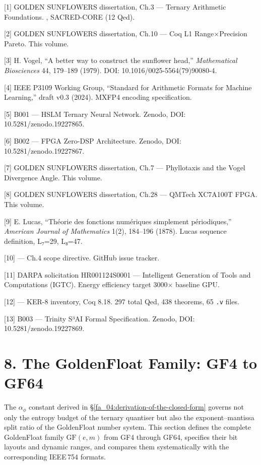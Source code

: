 [1] GOLDEN SUNFLOWERS dissertation, Ch.3 ---
Ternary Arithmetic Foundations.
,
SACRED-CORE (12 Qed).

[2] GOLDEN SUNFLOWERS dissertation, Ch.10 ---
Coq L1 Range$\times$Precision Pareto. This volume.

[3] H. Vogel, ``A better way to construct the
sunflower head,'' \emph{Mathematical Biosciences}
44, 179--189 (1979). DOI:
10.1016/0025-5564(79)90080-4.

[4] IEEE P3109 Working Group, ``Standard for
Arithmetic Formats for Machine Learning,'' draft
v0.3 (2024). MXFP4 encoding specification.

[5] B001 --- HSLM Ternary Neural Network.
Zenodo, DOI: 10.5281/zenodo.19227865.

[6] B002 --- FPGA Zero-DSP Architecture.
Zenodo, DOI: 10.5281/zenodo.19227867.

[7] GOLDEN SUNFLOWERS dissertation, Ch.7 ---
Phyllotaxis and the Vogel Divergence Angle. This
volume.

[8] GOLDEN SUNFLOWERS dissertation, Ch.28 ---
QMTech XC7A100T FPGA. This volume.

[9] E. Lucas, ``Théorie des fonctions
numériques simplement périodiques,''
\emph{American Journal of Mathematics} 1(2),
184--196 (1878). Lucas sequence definition, L₇=29,
L₈=47.

[10]  --- Ch.4
scope directive. GitHub issue tracker.

[11] DARPA solicitation HR001124S0001 ---
Intelligent Generation of Tools and Computations
(IGTC). Energy efficiency target 3000$\times$ baseline
GPU.

[12]
--- KER-8 inventory, Coq 8.18. 297 total Qed, 438
theorems, 65 \texttt{.v} files.

[13] B003 --- Trinity S³AI Formal
Specification. Zenodo, DOI:
10.5281/zenodo.19227869.

\section{8. The GoldenFloat Family: GF4 to GF64}\label{fa_04:goldenfloat-family}

The \(\alpha_\phi\) constant derived in §\ref{fa_04:derivation-of-the-closed-form}
governs not only the entropy budget of the ternary quantiser but also the
exponent--mantissa split ratio of the GoldenFloat number system. This section
defines the complete GoldenFloat family \(\mathrm{GF}(e,m)\) from GF4 through
GF64, specifies their bit layouts and dynamic ranges, and compares them
systematically with the corresponding IEEE\,754 formats.

